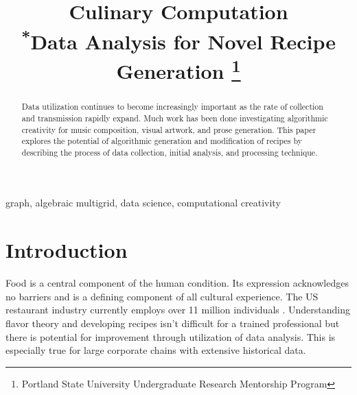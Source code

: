 \documentclass[conference]{IEEEtran}
\begin{document}
\title{Culinary Computation\\
{\footnotesize \textsuperscript{*}Data Analysis for Novel Recipe Generation}
\thanks{Portland State University Undergraduate Research Mentorship Program}
}

\author{
\and
{}
}

\maketitle

\begin{abstract}
Data utilization continues to become increasingly important as the rate of collection and
transmission rapidly expand. Much work has been done investigating algorithmic creativity for
music composition, visual artwork, and prose generation. This paper explores the potential
of algorithmic generation and modification of recipes by describing the process of data
collection, initial analysis, and processing technique.
\end{abstract}

\begin{IEEEkeywords}
graph, algebraic multigrid, data science, computational creativity
\end{IEEEkeywords}

\section{Introduction}
Food is a central component of the human condition. Its expression acknowledges no barriers
and is a defining component of all cultural experience. The US restaurant industry currently
employs over 11 million individuals \cite{BoL}.
Understanding flavor theory and developing recipes isn't difficult for a trained professional
but there is potential for improvement through utilization of data analysis. This is especially
true for large corporate chains with extensive historical data.
\end{document}
